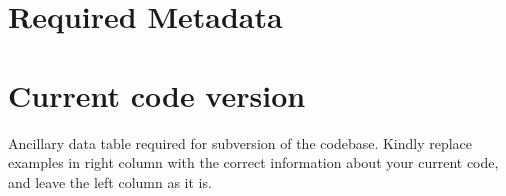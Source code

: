 \documentclass[preprint,letterpaper]{elsarticle}
\begin{document}






%
%


\section*{Required Metadata}

\section*{Current code version}

Ancillary data table required for subversion of the codebase. Kindly replace examples in right column with the correct information about your current code, and leave the left column as it is.
\end{document}

